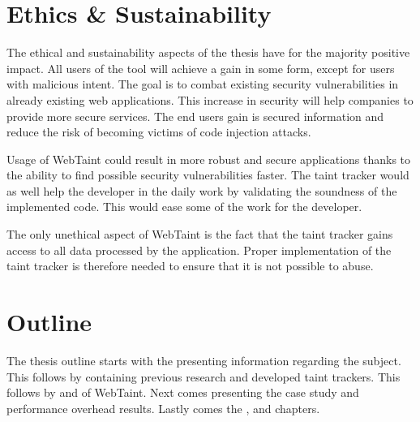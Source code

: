 \section{Ethics \& Sustainability}
\label{Ethics}
The ethical and sustainability aspects of the thesis have for the majority positive impact. All users of the tool will achieve a gain in some form, except for users with malicious intent. The goal is to combat existing security vulnerabilities in already existing web applications. This increase in security will help companies to provide more secure services. The end users gain is secured information and reduce the risk of becoming victims of code injection attacks.

Usage of WebTaint could result in more robust and secure applications thanks to the ability to find possible security vulnerabilities faster. The taint tracker would as well help the developer in the daily work by validating the soundness of the implemented code. This would ease some of the work for the developer.

The only unethical aspect of WebTaint is the fact that the taint tracker gains access to all data processed by the application. Proper implementation of the taint tracker is therefore needed to ensure that it is not possible to abuse.



\section{Outline}
\label{Outline}
The thesis outline starts with the \textit{} presenting information regarding the subject. This follows by \textit{} containing previous research and developed taint trackers. This follows by \textit{} and \textit{} of WebTaint. Next comes \textit{} presenting the case study and performance overhead results. Lastly comes the \textit{}, \textit{} and \textit{} chapters.